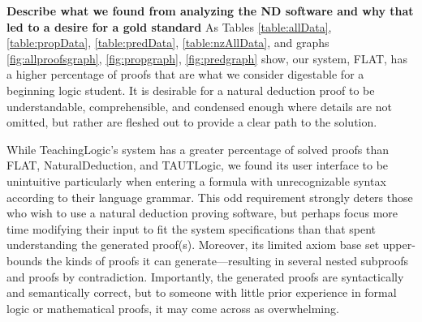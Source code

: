 \documentclass[ms]{uncgdissertationexp2}
\theoremstyle{plain}
\theoremstyle{definition}
\theoremstyle{remark}
\begin{document}
\textbf{Describe what we found from analyzing the ND software and why that led to a desire for a gold standard}
As Tables \ref{table:allData}, \ref{table:propData}, \ref{table:predData}, \ref{table:nzAllData}, and graphs \ref{fig:allproofsgraph}, \ref{fig:propgraph}, \ref{fig:predgraph} show, our system, FLAT, has a higher percentage of proofs that are what we consider digestable for a beginning logic student. It is desirable for a natural deduction proof to be understandable, comprehensible, and condensed enough where details are not omitted, but rather are fleshed out to provide a clear path to the solution. 

While TeachingLogic's system has a greater percentage of solved proofs than FLAT, NaturalDeduction, and TAUTLogic, we found its user interface to be unintuitive particularly when entering a formula with unrecognizable syntax according to their language grammar. This odd requirement strongly deters those who wish to use a natural deduction proving software, but perhaps focus more time modifying their input to fit the system specifications than that spent understanding the generated proof(s). Moreover, its limited axiom base set upper-bounds the kinds of proofs it can generate---resulting in several nested subproofs and proofs by contradiction. Importantly, the generated proofs are syntactically and semantically correct, but to someone with little prior experience in formal logic or mathematical proofs, it may come across as overwhelming. 
\end{document}
